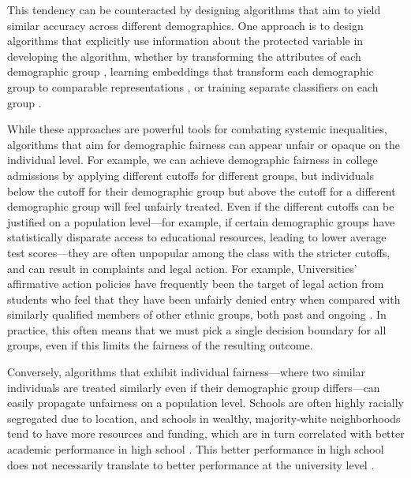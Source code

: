     This tendency can be counteracted by designing algorithms that aim to yield similar accuracy across different demographics. One approach is to design algorithms that explicitly use information about the protected variable in developing the algorithm, whether by transforming the attributes of each demographic group \citep{dwork2012fairness}, learning embeddings that transform each demographic group to comparable representations \citep{MadCrePitZem2018,ZemQiSwePitDwo2013}, or training separate classifiers on each group \citep{DwoImmKalTauLei2018}.
    
    While these approaches are powerful tools for combating systemic inequalities, algorithms that aim for demographic fairness can appear unfair or opaque on the individual level. For example, we can achieve demographic fairness in college admissions by applying different cutoffs for different groups, but individuals below the cutoff for their demographic group but above the cutoff for a different demographic group will feel unfairly treated. Even if the different cutoffs can be justified on a population level---for example, if certain demographic groups have statistically disparate access to educational resources, leading to lower average test scores---they are often unpopular among the class with the stricter cutoffs, and can result in complaints and legal action. For example, Universities' affirmative action policies have frequently been the target of legal action from students who feel that they have been unfairly denied entry when compared with similarly qualified members of other ethnic groups, both past \citep{2013fisher,2016fisher,1978Bakke} and ongoing \citep{2014SFFA}. In practice, this often means that we must pick a single decision boundary for all groups, even if this limits the fairness of the resulting outcome.
    
    Conversely, algorithms that exhibit individual fairness---where two similar individuals are treated similarly even if their demographic group differs---can easily propagate unfairness on a population level. Schools are often highly racially segregated due to location, and schools in wealthy, majority-white neighborhoods tend to have more resources and funding, which are in turn correlated with better academic performance in high school \citep{USCivilRights:2018,national2013nation}. This better performance in high school does not necessarily translate to better performance at the university level \citep{VidalRodeiro:Zanini:2015}.
    
